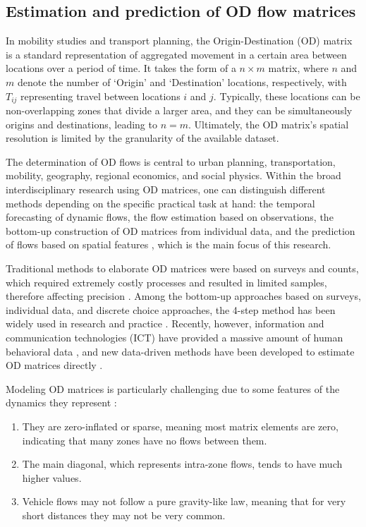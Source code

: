 \subsection{Estimation and prediction of OD flow matrices}
\label{sub:ETRCO2H_1.2intro_pred_OD}

In mobility studies and transport planning, the Origin-Destination (OD) matrix is a standard representation of aggregated movement in a certain area between locations over a period of time. It takes the form of a $n \times m$ matrix, where $n$ and $m$ denote the number of `Origin' and `Destination' locations, respectively, with $T_{ij}$ representing travel between locations $i$ and $j$. Typically, these locations can be non-overlapping zones that divide a larger area, and they can be simultaneously origins and destinations, leading to $n = m$. Ultimately, the OD matrix's spatial resolution is limited by the granularity of the available dataset. 

The determination of OD flows is central to urban planning, transportation, mobility, geography, regional economics, and social physics. Within the broad interdisciplinary research using OD matrices, one can distinguish different methods depending on the specific practical task at hand: the temporal forecasting of dynamic flows, the flow estimation based on observations, the bottom-up construction of OD matrices from individual data, and the prediction of flows based on spatial features \citep{Rong2023AnTechniques}, which is the main focus of this research.

Traditional methods to elaborate OD matrices were based on surveys and counts, which required extremely costly processes and resulted in limited samples, therefore affecting precision \citep{Axhausen2002ObservingDiary, Iqbal2014DevelopmentData, Schuessler2009ProcessingInformation}.  Among the bottom-up approaches based on surveys, individual data, and discrete choice approaches, the 4-step method has been widely used in research and practice \citep{McNally2007TheModel, Ortuzar2011ModellingTransport}. Recently, however, information and communication technologies (ICT) have provided a massive amount of human behavioral data \citep{Lenormand2015InfluenceMobility}, and new data-driven methods have been developed to estimate OD matrices directly \citep{Caceres2008ReviewNetworks}.

Modeling OD matrices is particularly challenging due to some features of the dynamics they represent  \citep{Thomas-Agnan2021SpatialModels}:
\begin{enumerate}
    \item They are zero-inflated or sparse, meaning most matrix elements are zero, indicating that many zones have no flows between them.
    \item The main diagonal, which represents intra-zone flows, tends to have much higher values.
    \item Vehicle flows may not follow a pure gravity-like law, meaning that for very short distances they may not be very common.
\end{enumerate}

